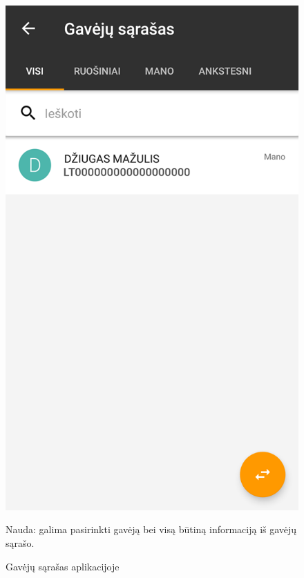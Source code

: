 \documentclass{VUMIFPSkursinis}
\begin{document}
\begin{figure}[!htb]
	\begin{center}
	\includegraphics[scale=0.4]{mobileAppRecipientList.png}
	\end{center}
  \caption{Gavėjų sąrašas aplikacijoje}
	\label{fig:mobileAppRecipientList}
	Nauda: galima pasirinkti gavėją bei visą būtiną informaciją iš gavėjų sąrašo.
\end{figure}
\end{document}
